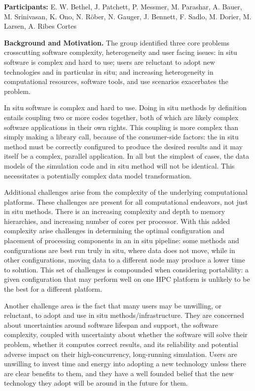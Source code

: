 
\license

\textbf{\sffamily Participants:} E. W. Bethel, J. Patchett, P. Messmer, M. Parashar, A. Bauer, M. Srinivasan, K. Ono, N. Röber, N. Gauger, J. Bennett, F. Sadlo, M. Dorier, M. Larsen, A. Ribes Cortes

\medskip\noindent
\textbf{\sffamily Background and Motivation.}
The group identified three core problems crosscutting software complexity, heterogeneity and user facing issues: in situ software is complex and hard to use; users are reluctant to adopt new technologies and in particular in situ; and increasing heterogeneity in computational resources, software tools, and use scenarios exacerbates the problem. 

In situ software is complex and hard to use. 
Doing in situ methods by definition entails coupling two or more codes together, both of which are likely complex software applications in their own rights. 
This coupling is more complex than simply making a library call, because of the consumer-side factors: the in situ method must be correctly configured to produce the desired results and it may itself be a complex, parallel application. 
In all but the simplest of cases, the data models of the simulation code and in situ method will not be identical.
This necessitates a potentially complex data model transformation.

Additional challenges arise from the complexity of the underlying computational platforms.
These challenges are present for all computational endeavors, not just in situ methods. 
There is an increasing complexity and depth to memory hierarchies, and increasing number of cores per processor. 
With this added complexity arise challenges in determining the optimal configuration and placement of processing components in an in situ pipeline: some methods and configurations are best run truly in situ, where data does not move, while in other configurations, moving data to a different node may produce a lower time to solution. 
This set of challenges is compounded when considering portability: a given configuration that may perform well on one HPC platform is unlikely to be the best for a different platform.

Another challenge area is the fact that many users may be unwilling, or reluctant, to adopt and use in situ methods/infrastructure. 
They are concerned about uncertainties around software lifespan and support, the software complexity, coupled with uncertainty about whether the software will solve their problem, whether it computes correct results, and its reliability and potential adverse impact on their high-concurrency, long-running simulation. 
Users are unwilling to invest time and energy into adopting a new technology unless there are clear benefits to them, and they have a well founded belief that the new technology they adopt will be around in the future for them.

